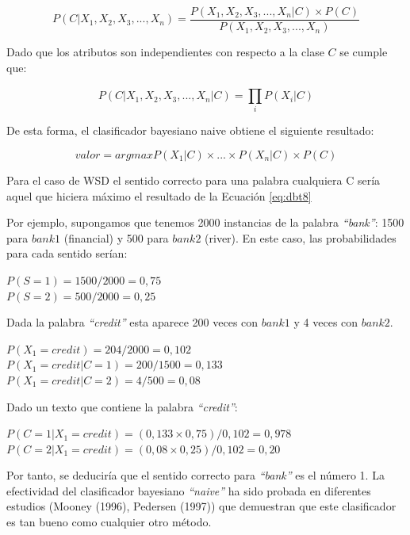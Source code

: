 \begin{itemize}
  \begin{equation}
    P(C|X_1,X_2,X_3,...,X_n)=\frac{P(X_1,X_2,X_3,...,X_n|C)\times P(C)}{P(X_1,X_2,X_3,...,X_n)}
    \label{eq:dbt6}
  \end{equation}

  Dado que los atributos son independientes con respecto a la clase $C$ se cumple que:

  \begin{equation}
    P(C|X_1,X_2,X_3,...,X_n|C)=\prod_{i}^{}P(X_i|C)
    \label{eq:dbt7}
  \end{equation}

  De esta forma, el clasificador bayesiano naive obtiene el siguiente resultado:

  \begin{equation}
    valor=arg max P(X_1|C)\times ... \times P(X_n|C) \times P(C)
    \label{eq:dbt8}
  \end{equation}

  Para el caso de WSD el sentido correcto para una palabra cualquiera C sería aquel que hiciera máximo el resultado de la Ecuación \ref{eq:dbt8}

  Por ejemplo, supongamos que tenemos 2000 instancias de la palabra \textit{“bank”}: 1500 para $bank1$ (financial) y 500 para $bank2$ (river). En este caso, las probabilidades para cada sentido serían:

  \begin{center}
  $P(S=1)=1500/2000=0,75$\\
  $P(S=2)=500/2000=0,25$
  \end{center}

  Dada la palabra \textit{“credit”} esta aparece 200 veces con $bank1$ y 4 veces con $bank2$.

  \begin{center}
    $P(X_1=credit)=204/2000=0,102$\\
    $P(X_1=credit|C=1)=200/1500=0,133$\\
    $P(X_1=credit|C=2)=4/500=0,08$
  \end{center}

  Dado un texto que contiene la palabra \textit{“credit”}:

  \begin{center}
    $P(C=1|X_1=credit)=(0,133 \times 0,75)/0,102=0,978$\\
    $P(C=2|X_1=credit)=(0,08 \times 0,25)/0,102=0,20$
  \end{center}

  Por tanto, se deduciría que el sentido correcto para \textit{“bank”} es el número 1. La efectividad del clasificador bayesiano \textit{“naive”} ha sido probada en diferentes estudios (Mooney (1996), Pedersen (1997)) que demuestran que este clasificador es tan bueno como cualquier otro método.


\end{itemize}
